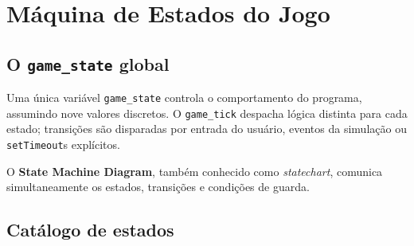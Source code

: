 \chapter{Máquina de Estados do Jogo}

\section{O \texttt{game\_state} global}

Uma única variável \texttt{game\_state} controla o comportamento do programa,
assumindo nove valores discretos. O \texttt{game\_tick} despacha lógica distinta para
cada estado; transições são disparadas por entrada do usuário, eventos da simulação
ou \texttt{setTimeout}s explícitos.

O \textbf{State Machine Diagram}, também conhecido como \emph{statechart}, comunica
simultaneamente os estados, transições e condições de guarda.


\section{Catálogo de estados}

